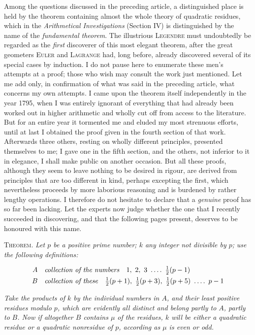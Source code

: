 Among the questions discussed in the preceding article, a distinguished place is held by the theorem containing almost the whole theory of quadratic residues, which in the \emph{Arithmetical Investigations} (Section IV) is distinguished by the name of the \emph{fundamental theorem}. The illustrious \textsc{Legendre} must undoubtedly be regarded as the \emph{first} discoverer of this most elegant theorem, after the great geometers \textsc{Euler} and \textsc{Lagrange} had, long before, already discovered several of its special cases by induction. I do not pause here to enumerate these men's attempts at a proof; those who wish may consult the work just mentioned. Let me add only, in confirmation of what was said in the preceding article, what concerns my own attempts. I came upon the theorem itself independently in the year 1795, when I was entirely ignorant of everything that had already been worked out in higher arithmetic and wholly cut off from access to the literature. But for an entire year it tormented me and eluded my most strenuous efforts, until at last I obtained the proof given in the fourth section of that work. Afterwards three others, resting on wholly different principles, presented themselves to me; I gave one in the fifth section, and the others, not inferior to it in elegance, I shall make public on another occasion. But all these proofs, although they seem to leave nothing to be desired in rigour, are derived from principles that are too different in kind, perhaps excepting the first, which nevertheless proceeds by more laborious reasoning and is burdened by rather lengthy operations. I therefore do not hesitate to declare that a \emph{genuine} proof has so far been lacking. Let the experts now judge whether the one that I recently succeeded in discovering, and that the following pages present, deserves to be honoured with this name.


\textsc{Theorem.} \emph{Let $p$ be a positive prime number; $k$ any integer not divisible by $p$;} \emph{use the following definitions:}

\[
\begin{aligned}
A &\quad \text{\emph{collection of the numbers}}\quad 1,\ 2,\ 3\ \dotsfour\ \tfrac12(p-1)\\
B &\quad \text{\emph{collection of these}}\quad \tfrac12(p+1),\ \tfrac12(p+3),\ \tfrac12(p+5)\ \dotsfour\ p-1
\end{aligned}
\]

\emph{Take the products of $k$ by the individual numbers in $A$, and their least positive residues modulo $p$, which are evidently all distinct and belong partly to $A$, partly to} \emph{$B$. Now if altogether $B$ contains $\mu$ of the residues, $k$ will be either a quadratic residue or a quadratic nonresidue of $p$, according as $\mu$ is even or odd.}

